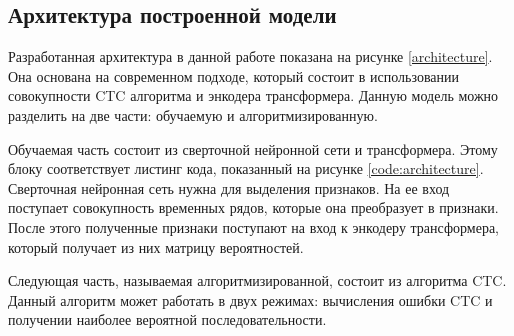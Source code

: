 \vspace{0.5cm}
\subsection{Архитектура построенной модели}

Разработанная архитектура в данной работе показана на рисунке \ref{architecture}. Она основана на современном подходе, который состоит в использовании совокупности CTC алгоритма и энкодера трансформера. Данную модель можно разделить на две части: обучаемую и алгоритмизированную.


Обучаемая часть состоит из сверточной нейронной сети и трансформера. Этому блоку соответствует листинг кода, показанный на рисунке \ref{code:architecture}. Сверточная нейронная сеть нужна для выделения признаков. На ее вход поступает совокупность временных рядов, которые она преобразует в признаки. После этого полученные признаки поступают на вход к энкодеру трансформера, который получает из них матрицу вероятностей.

Следующая часть, называемая алгоритмизированной, состоит из алгоритма CTC. Данный алгоритм может работать в двух режимах: вычисления ошибки CTC и получении наиболее вероятной последовательности.






